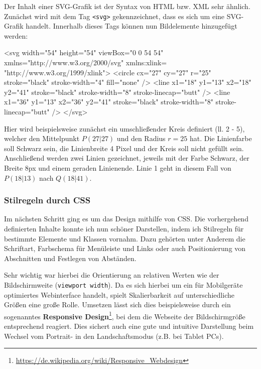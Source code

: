 Der Inhalt einer SVG-Grafik ist der Syntax von HTML bzw. XML sehr ähnlich. Zunächst
wird mit dem Tag \texttt{<svg>} gekennzeichnet, dass es sich um eine SVG-Grafik
handelt. Innerhalb dieses Tags können nun Bildelemente hinzugefügt werden:

\begin{code}[language=svg, caption={Bildelemente in einer SVG-Grafik}]
<svg width="54" height="54" viewBox="0 0 54 54" xmlns="http://www.w3.org/2000/svg" xmlns:xlink= "http://www.w3.org/1999/xlink">
	<circle
		cx="27" cy="27" r="25"
		stroke="black" stroke-width="4" fill="none"
	/>
	<line
		x1="18" y1="13"
		x2="18" y2="41"
		stroke="black" stroke-width="8" stroke-linecap="butt"
	/>
	<line
		x1="36" y1="13"
		x2="36" y2="41"
		stroke="black" stroke-width="8" stroke-linecap="butt"
	/>
</svg>
\end{code}

Hier wird beispielsweise zunächst ein umschließender Kreis definiert (ll. 2 - 5),
welcher den Mittelpunkt $P(27|27)$ und den Radius $r = 25$ hat. Die Linienfarbe
soll Schwarz sein, die Linienbreite 4 Pixel und der Kreis soll nicht gefüllt sein.
Anschließend werden zwei Linien gezeichnet, jeweils mit der Farbe Schwarz, der Breite
8px und einem geraden Linienende. Linie 1 geht in diesem Fall von $P(18|13)$ nach
$Q(18|41)$.

\subsubsection{Stilregeln durch CSS}
\label{subsubsec:webtools-remote-design-css}

Im nächsten Schritt ging es um das Design mithilfe von CSS. Die vorhergehend definierten
Inhalte konnte ich nun schöner Darstellen, indem ich Stilregeln für bestimmte Elemente
und Klassen vornahm. Dazu gehörten unter Anderem die Schriftart, Farbschema für
Menüleiste und Links oder auch Positionierung von Abschnitten und Festlegen von
Abständen.

Sehr wichtig war hierbei die Orientierung an relativen Werten wie der Bildschirmweite
(\texttt{viewport width}). Da es sich hierbei um ein für Mobilgeräte optimiertes
Webinterface handelt, spielt Skalierbarkeit auf unterschiedliche Größen eine große
Rolle. Umsetzen lässt sich dies beispielsweise durch ein sogenanntes \textbf{Responsive
Design}\footnote{\url{https://de.wikipedia.org/wiki/Responsive_Webdesign}}, bei dem
die Webseite der Bildschirmgröße entsprechend reagiert. Dies sichert auch eine gute
und intuitive Darstellung beim Wechsel vom Portrait- in den Landschaftsmodus (z.B.
bei Tablet PCs).

